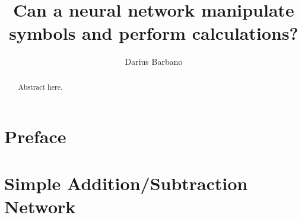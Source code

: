 \documentclass[12pt]{article}
\begin{document}
\title{Can a neural network manipulate symbols and perform calculations? }
\author{Darius Barbano}
\date{}
\maketitle
\begin{abstract}
   Abstract here.
\end{abstract}
\newpage
\section{Preface}


\newpage
\section{Simple Addition/Subtraction Network}

\end{document}
